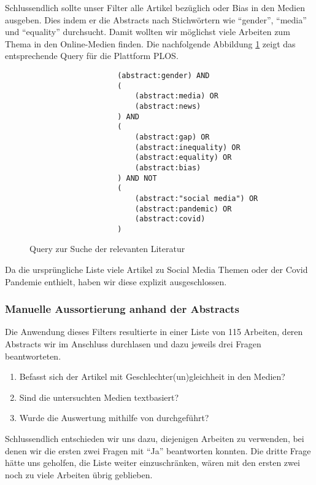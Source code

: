 Schlussendlich sollte unser Filter alle Artikel bezüglich  oder Bias in den Medien ausgeben.
Dies indem er die Abstracts nach Stichwörtern wie \enquote{gender}, \enquote{media} und \enquote{equality}
durchsucht. Damit wollten wir möglichst viele Arbeiten zum Thema  in den Online-Medien
finden. Die nachfolgende Abbildung \ref{plos-query} zeigt das entsprechende Query
für die Plattform PLOS.

\begin{figure}[h]
    \begin{verbatim}
                    (abstract:gender) AND 
                    (
                        (abstract:media) OR 
                        (abstract:news)
                    ) AND 
                    (
                        (abstract:gap) OR 
                        (abstract:inequality) OR 
                        (abstract:equality) OR 
                        (abstract:bias)
                    ) AND NOT
                    (
                        (abstract:"social media") OR 
                        (abstract:pandemic) OR 
                        (abstract:covid)
                    )
    \end{verbatim}
    \caption{Query zur Suche der relevanten Literatur}
    \label{plos-query}
\end{figure}

Da die ursprüngliche Liste viele Artikel zu Social Media Themen oder der Covid Pandemie enthielt, haben wir diese explizit
ausgeschlossen.

\subsubsection{Manuelle Aussortierung anhand der Abstracts}
Die Anwendung dieses Filters resultierte in einer Liste von 115 Arbeiten, deren Abstracts wir im Anschluss durchlasen
und dazu jeweils drei Fragen beantworteten.

\begin{enumerate}
    \item Befasst sich der Artikel mit Geschlechter(un)gleichheit in den Medien?
    \item Sind die untersuchten Medien textbasiert?
    \item Wurde die Auswertung mithilfe von  durchgeführt?
\end{enumerate}

Schlussendlich entschieden wir uns dazu, diejenigen Arbeiten zu verwenden, bei denen wir die ersten zwei Fragen mit
\enquote{Ja} beantworten konnten. Die dritte Frage hätte uns geholfen, die Liste weiter einzuschränken, wären
mit den ersten zwei noch zu viele Arbeiten übrig geblieben.

